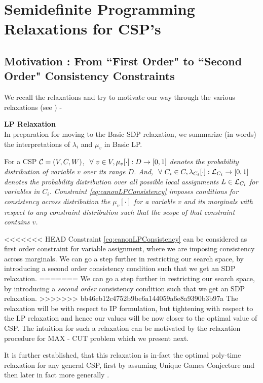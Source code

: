 \section{Semidefinite Programming Relaxations for CSP's}

\subsection{Motivation : From ``First Order" to ``Second Order" Consistency Constraints}

We recall the relaxations and try to motivate our way through the various relaxations (see \cite{Ryan}) -

\begin{discussion}{\bf LP Relaxation}\\
In preparation for moving to the Basic SDP relaxation, we summarize (in words) the interpretations of $\lambda_i$ and $\mu_v$ in Basic LP.

For a CSP $\mathcal{C} = (V, C, W)$,  \textit{$\ \forall \  v \in V, \mu_v[\cdot] : D \rightarrow [0, 1]$ denotes the \textit{probability distribution of variable $v$ over its range $D$}. And, $\ \forall \  C_i \in C, \lambda_{C_i}[\cdot] : \mathcal{L}_{C_i} \rightarrow [0,1]$ denotes the probability distribution over all possible local assignments $L \in \mathcal{L}_{C_i}$ for variables in  $C_i$.  
Constraint \ref{eq:canonLPConsistency} imposes conditions for consistency across distribution the $\mu_v[\cdot]$ for a variable $v$ and its marginals with respect to any constraint distribution such that the scope of that constraint contains $v$.}
\end{discussion}

<<<<<<< HEAD
Constraint \ref{eq:canonLPConsistency} can be considered as first order constraint for variable assignment, where we are imposing consistency across marginals. 
We can go a step further in restricting our search space, by introducing a second order consistency condition such that we get an SDP relaxation. 
=======
We can go a step further in restricting our search space, by introducing a \textit{second order} consistency condition such that we get an SDP relaxation. 
>>>>>>> bb46eb12c4752b9be6a144059a6e8a9390b3b97a
The relaxation will be with respect to IP formulation, but tightening with respect to the LP relaxation and hence our values will be now closer to the optimal value of CSP. 
The intuition for such a relaxation can be motivated by the relaxation procedure for MAX - CUT problem which we present next. 

It is further established, that this relaxation is in-fact the optimal poly-time relaxation for any general CSP, first by assuming Unique Games Conjecture \cite{Khot} and then later in fact more generally \cite{nphard}. 

